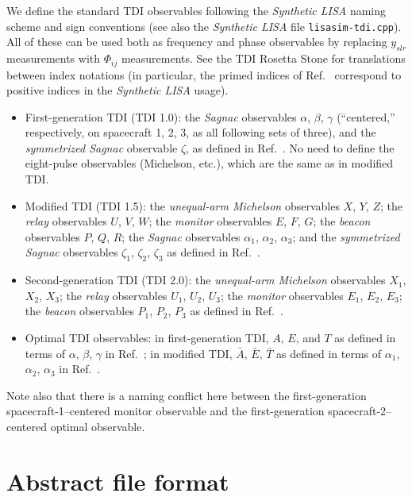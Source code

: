 \documentclass[11pt]{report}
\begin{document}
We define the standard TDI observables following the \emph{Synthetic LISA} \cite{synthlisa,vallis2005} naming scheme
and sign conventions (see also the \emph{Synthetic LISA} file \texttt{lisasim-tdi.cpp}). All of these can be used both
as frequency and phase observables by replacing $y_{slr}$ measurements with $\Phi_{ij}$ measurements. See the TDI
Rosetta Stone \cite{rosetta} for translations between index notations (in particular, the primed indices of
Ref.\ \cite{secondgen} correspond to positive indices in the \emph{Synthetic LISA} usage). 
%
\begin{itemize}
%
\item First-generation TDI (TDI 1.0): the \emph{Sagnac} observables $\alpha$, $\beta$, $\gamma$ (``centered,'' respectively, on spacecraft 1, 2, 3, as all following sets of three), and the \emph{symmetrized Sagnac} observable $\zeta$, as defined in Ref.\ \cite{firstgen}. No need to define the eight-pulse observables (Michelson, etc.), which are the same as in modified TDI.
%
\item Modified TDI (TDI 1.5): the \emph{unequal-arm Michelson} observables $X$, $Y$, $Z$;
the \emph{relay} observables $U$, $V$, $W$; the \emph{monitor} observables $E$, $F$, $G$; the \emph{beacon} observables $P$, $Q$, $R$; the \emph{Sagnac} observables $\alpha_1$, $\alpha_2$, $\alpha_3$; and the \emph{symmetrized Sagnac} observables $\zeta_1$, $\zeta_2$, $\zeta_3$ as defined in Ref.\ \cite{secondgen}.
%
\item Second-generation TDI (TDI 2.0): the \emph{unequal-arm Michelson} observables $X_1$, $X_2$, $X_3$;
the \emph{relay} observables $U_1$, $U_2$, $U_3$; the \emph{monitor} observables $E_1$, $E_2$, $E_3$; the \emph{beacon} observables $P_1$, $P_2$, $P_3$ as defined in Ref.\ \cite{secondgen}.
%
\item Optimal TDI observables: in first-generation TDI, $A$, $E$, and $T$ as defined in terms of $\alpha$, $\beta$, $\gamma$ in Ref.\ \cite{optimal}; in modified TDI, $\bar{A}$, $\bar{E}$, $\bar{T}$ as defined in terms of $\alpha_1$, $\alpha_2$, $\alpha_3$ in Ref.\ \cite{ktv}.
%
\end{itemize}
%
Note also that there is a naming conflict here between the first-generation spacecraft-1--centered monitor
observable and the first-generation spacecraft-2--centered optimal observable. 

\section{Abstract file format}
\end{document}
